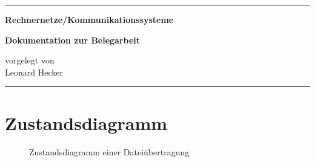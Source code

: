 


\begin{titlepage}
	\vspace*{\fill}

	\rule{\textwidth}{0.25pt}

	\vspace*{1cm}

	\begin{singlespace}
		\begin{center} \Large \bfseries
			Rechnernetze/Kommunikationssysteme
		\end{center}
	\end{singlespace}

	\vspace{2em}

	\begin{singlespace}
		\begin{center} \bfseries
			Dokumentation zur Belegarbeit
		\end{center}
	\end{singlespace}

	\vspace*{6cm}

	\begin{center}
		vorgelegt von \\
		\vspace{2em}
		Leonard Hecker
	\end{center}

	\vspace*{1cm}

	\rule{\textwidth}{0.25pt}

	\vspace*{\fill}
\end{titlepage}


\tableofcontents


\chapter{Zustandsdiagramm}

\begin{figure}[hbp]
	\centering
	\caption{Zustandsdiagramm einer Dateiübertragung}
	\label{ERM}
\end{figure}

